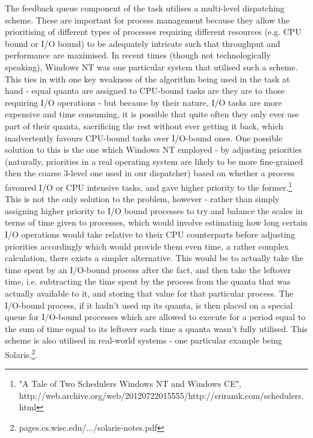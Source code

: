 \documentclass[11pt]{article}
\begin{document}
\begin{itemize}
The feedback queue component of the task utilises a multi-level dispatching scheme. These are important for process management because they allow the prioritising of different types of processes requiring different resources (e.g. CPU bound or I/O bound) to be adequately intricate such that throughput and performance are maximised. In recent times (though not technologically speaking), Windows NT was one particular system that utilised such a scheme. This ties in with one key weakness of the algorithm being used in the task at hand - equal quanta are assigned to CPU-bound tasks are they are to those requiring I/O operations - but because by their nature, I/O tasks are more expensive and time consuming, it is possible that quite often they only ever use part of their quanta, sacrificing the rest without ever getting it back, which inadvertently favours CPU-bound tasks over I/O-bound ones. One possible solution to this is the one which Windows NT employed - by adjusting priorities (naturally, priorities in a real operating system are likely to be more fine-grained then the coarse 3-level one used in our dispatcher) based on whether a process favoured I/O or CPU intensive tasks, and gave higher priority to the former.\footnote{"A Tale of Two Schedulers Windows NT and Windows CE", http://web.archive.org/web/20120722015555/http://sriramk.com/schedulers.html}\\

This is not the only solution to the problem, however - rather than simply assigning higher priority to I/O bound processes to try and balance the scales in terms of time given to processes, which would involve estimating how long certain I/O operations would take relative to their CPU counterparts before adjusting priorities accordingly which would provide them even time, a rather complex calculation, there exists a simpler alternative. This would be to actually take the time spent by an I/O-bound process after the fact, and then take the leftover time, i.e. subtracting the time spent by the process from the quanta that was actually available to it, and storing that value for that particular process. The I/O-bound process, if it hadn't used up its quanta, is then placed on a special queue for I/O-bound processes which are allowed to execute for a period equal to the sum of time equal to its leftover each time a quanta wasn't fully utilised. This scheme is also utilised in real-world systems - one particular example being Solaris.\footnote{pages.cs.wisc.edu/.../solaris-notes.pdf}.\\


\end{itemize}
\end{document}
